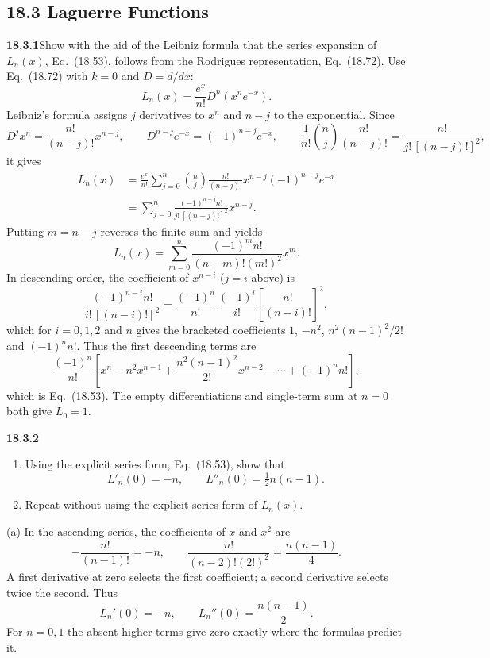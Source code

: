 \subsection*{18.3 Laguerre Functions}

\par\bigskip
\noindent\textbf{18.3.1}\quad Show with the aid of the Leibniz
formula that the series expansion of $L_{n}(x)$, Eq.~(18.53), follows
from the Rodrigues representation, Eq.~(18.72).
\solution
Use Eq.~(18.72) with $k=0$ and $D=d/dx$:
\[
L_n(x)=\frac{e^x}{n!}D^n(x^ne^{-x}).
\]
Leibniz's formula assigns $j$ derivatives to $x^n$ and $n-j$ to
the exponential.  Since
\[
D^jx^n=\frac{n!}{(n-j)!}x^{n-j},\qquad
D^{n-j}e^{-x}=(-1)^{n-j}e^{-x},\qquad
\frac1{n!}\binom nj\frac{n!}{(n-j)!}=\frac{n!}{j!\,[(n-j)!]^2},
\]
it gives
\begin{align*}
L_n(x)
 &=\frac{e^x}{n!}\sum_{j=0}^n\binom nj
       \frac{n!}{(n-j)!}x^{n-j}(-1)^{n-j}e^{-x}\\
 &=\sum_{j=0}^n
       \frac{(-1)^{n-j}n!}{j!\,[(n-j)!]^2}x^{n-j}.
\end{align*}
Putting $m=n-j$ reverses the finite sum and yields
\[
\boxed{L_n(x)=\sum_{m=0}^n
 \frac{(-1)^mn!}{(n-m)!(m!)^2}x^m}.
\]
In descending order, the coefficient of $x^{n-i}$ ($j=i$ above) is
\[
\frac{(-1)^{n-i}n!}{i!\,[(n-i)!]^2}
 =\frac{(-1)^n}{n!}\,\frac{(-1)^i}{i!}\left[\frac{n!}{(n-i)!}\right]^2,
\]
which for $i=0,1,2$ and $n$ gives the bracketed coefficients $1$,
$-n^2$, $n^2(n-1)^2/2!$ and $(-1)^nn!$.  Thus the first descending
terms are
\[
\frac{(-1)^n}{n!}
 \left[x^n-n^2x^{n-1}
 +\frac{n^2(n-1)^2}{2!}x^{n-2}-\cdots+(-1)^nn!\right],
\]
which is Eq.~(18.53).  The empty differentiations and single-term
sum at $n=0$ both give $L_0=1$.

\par\bigskip
\noindent\textbf{18.3.2}
\begin{enumerate}
\item[(a)] Using the explicit series form, Eq.~(18.53), show that
\[
L'_{n}(0)=-n,\qquad L''_{n}(0)=\tfrac{1}{2}n(n-1).
\]
\item[(b)] Repeat without using the explicit series form of
$L_{n}(x)$.
\end{enumerate}
\solution
(a) In the ascending series, the coefficients of $x$ and $x^2$ are
\[
-\frac{n!}{(n-1)!}=-n,\qquad
\frac{n!}{(n-2)!(2!)^2}=\frac{n(n-1)}4.
\]
A first derivative at zero selects the first coefficient; a second
derivative selects twice the second.  Thus
\[
\boxed{L_n'(0)=-n,\qquad L_n''(0)=\frac{n(n-1)}2}.
\]
For $n=0,1$ the absent higher terms give zero exactly where the
formulas predict it.

